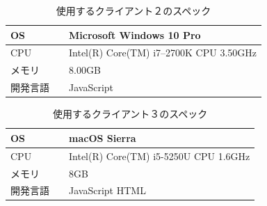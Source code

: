\begin{table}[htbp]
\begin{center}
	\caption{使用するクライアント２のスペック}
	\begin{tabular}{|l|l|} \hline
		OS & Microsoft Windows 10 Pro \\ \hline
		CPU & Intel(R) Core(TM) i7--2700K CPU 3.50GHz \\ \hline
		メモリ & 8.00GB \\ \hline
    開発言語　& JavaScript \\ \hline
	\end{tabular}
	\label{client2}
\end{center}
\end{table}



\begin{table}[htbp]
\begin{center}
	\caption{使用するクライアント３のスペック}
	\begin{tabular}{|l|l|} \hline
		OS & macOS Sierra \\ \hline
		CPU & Intel(R) Core(TM) i5-5250U CPU 1.6GHz \\ \hline
		メモリ & 8GB \\ \hline
    開発言語　& JavaScript HTML \\ \hline
	\end{tabular}
	\label{client3}
\end{center}
\end{table}

